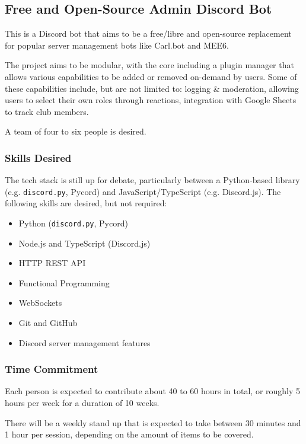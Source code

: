 \documentclass[../proposal-for-projects-2025.tex]{subfiles}
\begin{document}
\subsection{Free and Open-Source Admin Discord Bot}

This is a Discord bot that aims to be a free/libre and open-source replacement for popular server management bots like Carl.bot and MEE6.  

The project aims to be modular, with the core including a plugin manager that allows various capabilities to be added or removed on-demand by users. Some of these capabilities include, but are not limited to: logging \& moderation, allowing users to select their own roles through reactions, integration with Google Sheets to track club members.

A team of four to six people is desired.

\subsubsection*{Skills Desired}

The tech stack is still up for debate, particularly between a Python-based library (e.g. \texttt{discord.py}, Pycord) and JavaScript/TypeScript (e.g. Discord.js).  The following skills are desired, but not required:

\begin{multicols}{2}
\begin{itemize}
	\item Python (\texttt{discord.py}, Pycord)
    \item Node.js and TypeScript (Discord.js)
    \item HTTP REST API
    \item Functional Programming
    \item WebSockets
    \item Git and GitHub
    \item Discord server management features
\end{itemize}
\end{multicols}

\subsubsection*{Time Commitment}

Each person is expected to contribute about 40 to 60 hours in total, or roughly 5 hours per week for a duration of 10 weeks.

There will be a weekly stand up that is expected to take between 30 minutes and 1 hour per session, depending on the amount of items to be covered.
\end{document}
